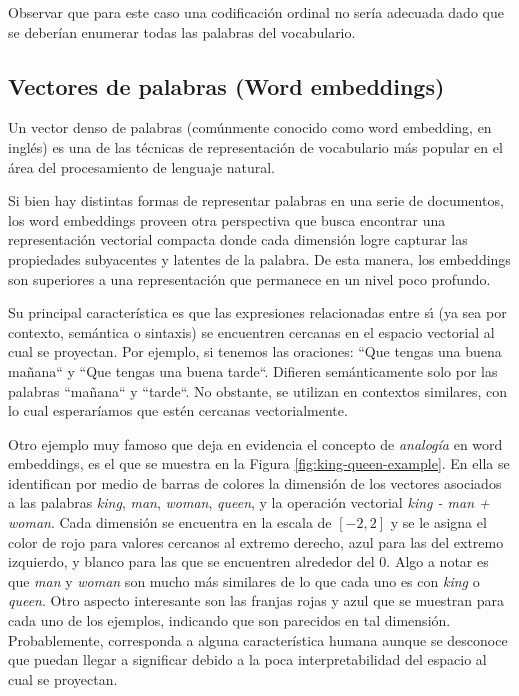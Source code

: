 Observar que para este caso una codificación ordinal no sería adecuada dado que
se deberían enumerar todas las palabras del vocabulario.

\subsection{Vectores de palabras (Word embeddings)}
\label{method:wb}

Un vector denso de palabras (comúnmente conocido como word embedding, en inglés)
es una de las técnicas de representación de vocabulario más popular en el área
del procesamiento de lenguaje natural.

Si bien hay distintas formas de representar palabras en una serie de documentos,
los word embeddings proveen otra perspectiva que busca encontrar una
representación vectorial compacta donde cada dimensión logre capturar las
propiedades subyacentes y latentes de la palabra. De esta manera, los embeddings
son superiores a una representación que permanece en un nivel poco profundo.

Su principal característica es que las expresiones relacionadas entre sı́ (ya
sea por contexto, semántica o sintaxis) se encuentren cercanas en el espacio
vectorial al cual se proyectan. Por ejemplo, si tenemos las oraciones: ``Que
tengas una buena mañana`` y ``Que tengas una buena tarde``. Difieren
semánticamente solo por las palabras ``mañana`` y ``tarde``. No obstante, se
utilizan en contextos similares, con lo cual esperaríamos que estén cercanas
vectorialmente.

Otro ejemplo muy famoso que deja en evidencia el concepto de \emph{analogía} en
word embeddings, es el que se muestra en la Figura \ref{fig:king-queen-example}.
En ella se identifican por medio de barras de colores la dimensión de los
vectores asociados a las palabras \emph{king}, \emph{man}, \emph{woman},
\emph{queen}, y la operación vectorial \emph{king - man + woman}. Cada dimensión
se encuentra en la escala de $[-2, 2]$ y se le asigna el color de rojo para
valores cercanos al extremo derecho, azul para las del extremo izquierdo, y
blanco para las que se encuentren alrededor del 0.  Algo a notar es que
\emph{man} y \emph{woman} son mucho más similares de lo que cada uno es con
\emph{king} o \emph{queen}. Otro aspecto interesante son las franjas rojas y azul
que se muestran para cada uno de los ejemplos, indicando que son parecidos en
tal dimensión. Probablemente, corresponda a alguna característica humana aunque
se desconoce que puedan llegar a significar debido a la poca interpretabilidad
del espacio al cual se proyectan.

